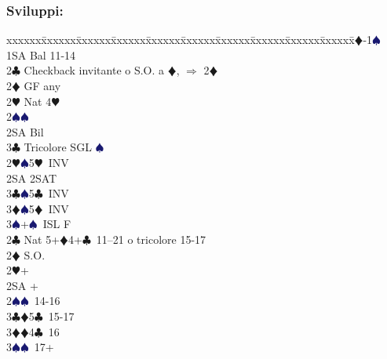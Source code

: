 \documentclass[a4paper,italian]{article}
\newcommand{\BC}{\textcolor{OliveGreen}{$\clubsuit$}}
\newcommand{\BD}{\textcolor{RedOrange}{$\vardiamondsuit$}}
\newcommand{\BH}{\textcolor{Red2}{$\varheartsuit${}}}
\newcommand{\BS}{\textcolor{MidnightBlue}{$\spadesuit${}}}
\newenvironment{bidtable}
{\begin{tabbing}

    xxxxxx\=xxxxxx\=xxxxxx\=xxxxxx\=xxxxxx\=xxxxxx\=xxxxxx\=xxxxxx\=xxxxxx\=xxxxxx\=\kill}
{\end{tabbing} }%
\begin{document}
\begin{multicols}{2}
                                        \subsubsection{Sviluppi:}

                                        \begin{bidtable}
                                            1\BD-1\BS\+\\
                                            1SA \> Bal 11-14\+\\
                                            2\BC \> Checkback invitante o S.O. a \BD , $\Rightarrow$ 2\BD \\
                                            2\BD \> GF any\+\\
                                            2\BH \> Nat 4\BH \\
                                            2\BS {}\BS \\
                                            2SA \> Bil\\
                                            3\BC \> Tricolore SGL \BS \-\\
                                            2\BH {}\BS 5\BH\ INV\\
                                            2SA \> 2SAT\\
                                            3\BC {}\BS 5\BC\ INV\\
                                            3\BD {}\BS 5\BD\ INV\\
                                            3\BS {}+\BS\ ISL F\-\\
                                            2\BC \> Nat 5+\BD 4+\BC\ 11--21 o tricolore 15-17\+\\
                                            2\BD \> S.O.\+\\
                                            2\BH {}+\\
                                            2SA +\\
                                            2\BS {}\BS\ 14-16\\
                                            3\BC {}\BD 5\BC\ 15-17\\
                                            3\BD {}\BD 4\BC\ 16\\
                                            3\BS {}\BS\ 17+\-\\

\end{bidtable}
\end{multicols}
\end{document}
